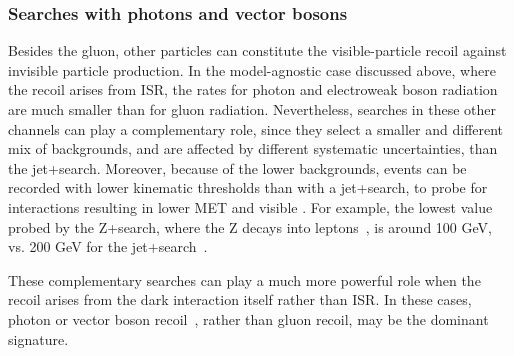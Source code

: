 \subsubsection{Searches with photons and vector bosons}
\label{subsub:monoV}



Besides the gluon, other particles can constitute the visible-particle recoil against invisible particle production. In the model-agnostic case discussed above, where the recoil arises from ISR, the rates for photon and electroweak boson radiation are much smaller than for gluon radiation. Nevertheless, searches in these other channels can play a complementary role, since they select a smaller and different mix of backgrounds, and are affected by different systematic uncertainties, than the jet+\MET search. Moreover, because of the lower backgrounds, events can be recorded with lower kinematic thresholds than with a jet+\MET search, to probe for interactions resulting in lower MET and visible \pt{}. For example, the lowest \MET value probed by the Z+\MET search, where the Z decays into leptons~\cite{Sirunyan:2017qfc,Aaboud:2017bja}, is around 100 GeV, vs. 
200 GeV for the jet+\MET search~\cite{Sirunyan:2017jix}.

These complementary searches can play a much more powerful role when the recoil arises from the dark interaction itself rather than ISR. In these cases, photon or vector boson recoil~\cite{Birkedal:2004xn,Petriello:2008pu,Carpenter:2012rg,Bell:2012rg}, rather than gluon recoil, may be the dominant signature.


